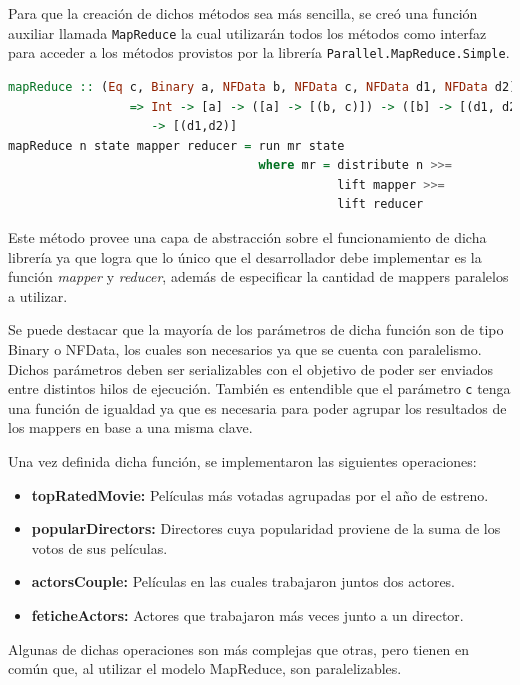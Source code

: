 \documentclass[a4paper,11pt]{article}
\begin{document}
Para que la creación de dichos métodos sea más sencilla, se creó una función auxiliar llamada \texttt{MapReduce} la cual utilizarán todos los métodos como interfaz para acceder a los métodos provistos por la librería \texttt{Parallel.MapReduce.Simple}. 

\begin{lstlisting}[language=Haskell, frame=single]
mapReduce :: (Eq c, Binary a, NFData b, NFData c, NFData d1, NFData d2) 
                 => Int -> [a] -> ([a] -> [(b, c)]) -> ([b] -> [(d1, d2)])
                    -> [(d1,d2)]
mapReduce n state mapper reducer = run mr state
                                   where mr = distribute n >>= 
                                              lift mapper >>= 
                                              lift reducer 
\end{lstlisting}

Este método provee una capa de abstracción sobre el funcionamiento de dicha librería ya que logra que lo único que el desarrollador debe implementar es la función \textit{mapper} y \textit{reducer}, además de especificar la cantidad de mappers paralelos a utilizar.

Se puede destacar que la mayoría de los parámetros de dicha función son de tipo Binary o NFData, los cuales son necesarios ya que se cuenta con paralelismo. Dichos parámetros deben ser serializables con el objetivo de poder ser enviados entre distintos hilos de ejecución. También es entendible que el parámetro \texttt{c} tenga una función de igualdad ya que es necesaria para poder agrupar los resultados de los mappers en base a una misma clave.

Una vez definida dicha función, se implementaron las siguientes operaciones:

\begin{itemize}
	\item \textbf{topRatedMovie:} Películas más votadas agrupadas por el año de estreno. 
	\item \textbf{popularDirectors:} Directores cuya popularidad proviene de la suma de los votos de sus películas.
	\item \textbf{actorsCouple:} Películas en las cuales trabajaron juntos dos actores.
	\item \textbf{feticheActors:} Actores que trabajaron más veces junto a un director.
\end{itemize}

Algunas de dichas operaciones son más complejas que otras, pero tienen en común que, al utilizar el modelo MapReduce, son paralelizables.
\end{document}
